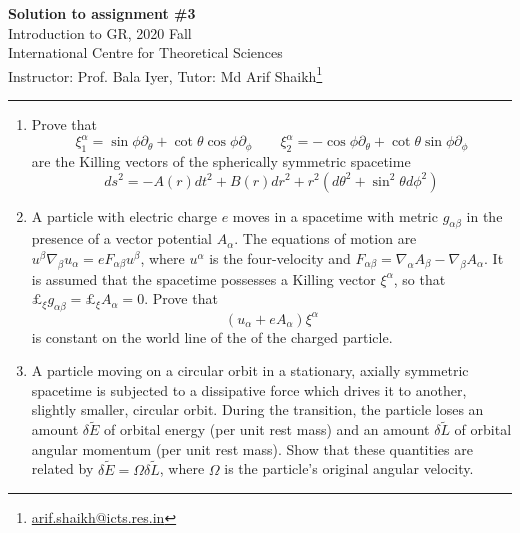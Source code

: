 \documentclass{article}
\begin{document}
\begin{center}
  {\bfseries Solution to assignment \#3}\\
  Introduction to GR, 2020 Fall\\
  International Centre for Theoretical Sciences\\
  Instructor: Prof. Bala Iyer, Tutor: Md Arif Shaikh\footnote{\href{mailto: arif.shaikh@icts.res.in}{arif.shaikh@icts.res.in}}\\
\end{center}
\hrule

\begin{enumerate}
\item[3.] Prove that
  \begin{equation}
    \label{eq:Killing-vectors-sph}
    \xi^\alpha_{1} = \sin\phi\partial_\theta + \cot\theta\cos\phi\partial_\phi\qquad \xi^\alpha_{2} = - \cos\phi\partial_\theta + \cot\theta\sin\phi\partial_\phi
  \end{equation}
  are the Killing vectors of the spherically symmetric spacetime
  \begin{equation}
    \label{eq:line-element-spherically-symmetric}
    ds^2 = -A(r)dt^2 + B(r)dr^2 + r^2 (d\theta^2 + \sin^2\theta d\phi^2)
  \end{equation}
  
\item[4.] A particle with electric charge $e$ moves in a spacetime with metric $g_{\alpha\beta}$ in the presence of a vector potential $A_\alpha$. The equations of motion are $u^\beta \nabla_\beta u_\alpha = e F_{\alpha\beta}u^\beta$, where $u^\alpha$ is the four-velocity and $F_{\alpha\beta}=\nabla_\alpha A_\beta - \nabla_\beta A_\alpha$. It is assumed that the spacetime possesses a Killing vector $\xi^\alpha$, so that $\pounds_\xi g_{\alpha\beta} = \pounds_\xi A_\alpha = 0$. Prove that
  \begin{equation}
    \label{eq:conserved-quantity-em-field}
    (u_\alpha + e A_\alpha)\xi^\alpha
  \end{equation}
  is constant on the world line of the of the charged particle.

\item[5.] A particle moving on a circular orbit in a stationary, axially symmetric spacetime is subjected to a dissipative force which drives it to another, slightly smaller, circular orbit. During the transition, the particle loses an amount $\delta \tilde{E}$ of orbital energy (per unit rest mass) and an amount $\delta \tilde{L}$ of orbital angular momentum (per unit rest mass). Show that these quantities are related by $\delta\tilde{E} = \Omega \delta\tilde{L}$, where $\Omega$ is the particle's original angular velocity.
  

\end{enumerate}
\end{document}
